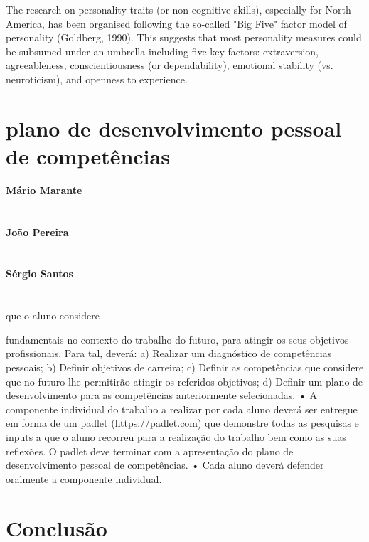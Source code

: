 The research on personality traits (or non-cognitive skills), especially for North America, has been organised following the so-called "Big Five" factor model of personality (Goldberg, 1990). This suggests that most personality measures could be subsumed under an umbrella including five key factors:
extraversion, agreeableness, conscientiousness (or dependability), emotional stability (vs. neuroticism), and openness to experience.\\







\section{plano de desenvolvimento pessoal de competências}
\textbf{Mário Marante}\\
\\ \\
\textbf{João Pereira}\\
\\ \\
\textbf{Sérgio Santos}\\
\\ \\



que o aluno considere

fundamentais no contexto do trabalho do futuro, para atingir os seus objetivos
profissionais. Para tal, deverá:
a) Realizar um diagnóstico de competências pessoais;
b) Definir objetivos de carreira;
c) Definir as competências que considere que no futuro lhe permitirão atingir os
referidos objetivos;
d) Definir um plano de desenvolvimento para as competências anteriormente
selecionadas.
• A componente individual do trabalho a realizar por cada aluno deverá ser entregue em forma de um padlet (https://padlet.com) que demonstre todas as pesquisas e inputs a que o aluno recorreu para a realização do trabalho bem como as suas reflexões. O padlet deve terminar com a apresentação do plano de
desenvolvimento pessoal de competências.
• Cada aluno deverá defender oralmente a componente individual.


\newpage
\section{Conclusão}



